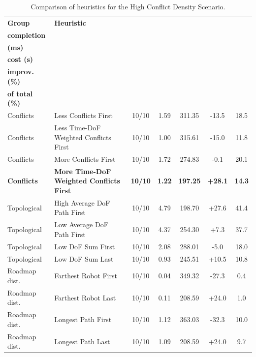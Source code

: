 \begin{table}[H]
\centering
\caption{Comparison of heuristics for the High Conflict Density Scenario.}
\label{tab:heuristics_high_conflict_density}
\scriptsize
\setlength{\tabcolsep}{3pt}
\begin{tabular}{@{}llccccc@{}}
\toprule
\textbf{Group} &
\textbf{Heuristic} &
\makecell{\textbf{Robot}\\\textbf{completion}} &
\makecell{\textbf{t perm.}\\\textbf{(ms)}} &
\makecell{\textbf{Excess}\\\textbf{cost (s)}} &
\makecell{\textbf{Cost}\\\textbf{improv. (\%)}} &
\makecell{\textbf{Perm. time}\\\textbf{of total (\%)}} \\
\midrule

Conflicts & Less Conflicts First & 10/10 & 1.59 & 311.35 & -13.5 & 18.5 \\
Conflicts & Less Time-DoF Weighted Conflicts First & 10/10 & 1.00 & 315.61 & -15.0 & 11.8 \\
Conflicts & More Conflicts First & 10/10 & 1.72 & 274.83 & -0.1 & 20.1 \\
\textbf{Conflicts} & \textbf{More Time-DoF Weighted Conflicts First} & \textbf{10/10} & \textbf{1.22} & \textbf{197.25} & \textbf{+28.1} & \textbf{14.3} \\

\midrule

Topological & High Average DoF Path First & 10/10 & 4.79 & 198.70 & +27.6 & 41.4 \\
Topological & Low Average DoF Path First & 10/10 & 4.37 & 254.30 & +7.3 & 37.7 \\
Topological & Low DoF Sum First & 10/10 & 2.08 & 288.01 & -5.0 & 18.0 \\
Topological & Low DoF Sum Last & 10/10 & 0.93 & 245.51 & +10.5 & 10.8 \\

\midrule

Roadmap dist. & Farthest Robot First & 10/10 & 0.04 & 349.32 & -27.3 & 0.4 \\
Roadmap dist. & Farthest Robot Last & 10/10 & 0.11 & 208.59 & +24.0 & 1.0 \\
Roadmap dist. & Longest Path First & 10/10 & 1.12 & 363.03 & -32.3 & 10.0 \\
Roadmap dist. & Longest Path Last & 10/10 & 1.09 & 208.59 & +24.0 & 9.7 \\


\end{tabular}
\end{table}
